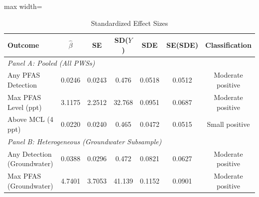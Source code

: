 \begin{table}[htbp]
\centering
\begin{threeparttable}
\caption{Standardized Effect Sizes}
\label{tab:sde}
\begin{adjustbox}{max width=\textwidth}
\begin{tabular}{lcccccc}
\toprule
Outcome & $\hat{\beta}$ & SE & SD($Y$) & SDE & SE(SDE) & Classification \\
\midrule
\multicolumn{7}{l}{\textit{Panel A: Pooled (All PWSs)}} \\[3pt]
Any PFAS Detection & 0.0246 & 0.0243 & 0.476 & 0.0518 & 0.0512 & Moderate positive \\
Max PFAS Level (ppt) & 3.1175 & 2.2512 & 32.768 & 0.0951 & 0.0687 & Moderate positive \\
Above MCL (4 ppt) & 0.0220 & 0.0240 & 0.465 & 0.0472 & 0.0515 & Small positive \\
\midrule
\multicolumn{7}{l}{\textit{Panel B: Heterogeneous (Groundwater Subsample)}} \\[3pt]
Any Detection (Groundwater) & 0.0388 & 0.0296 & 0.472 & 0.0821 & 0.0627 & Moderate positive \\
Max PFAS (Groundwater) & 4.7401 & 3.7053 & 41.139 & 0.1152 & 0.0901 & Moderate positive \\
\bottomrule
\end{tabular}
\end{adjustbox}
\begin{tablenotes}[flushleft]
\small

\end{tablenotes}
\end{threeparttable}
\end{table}
